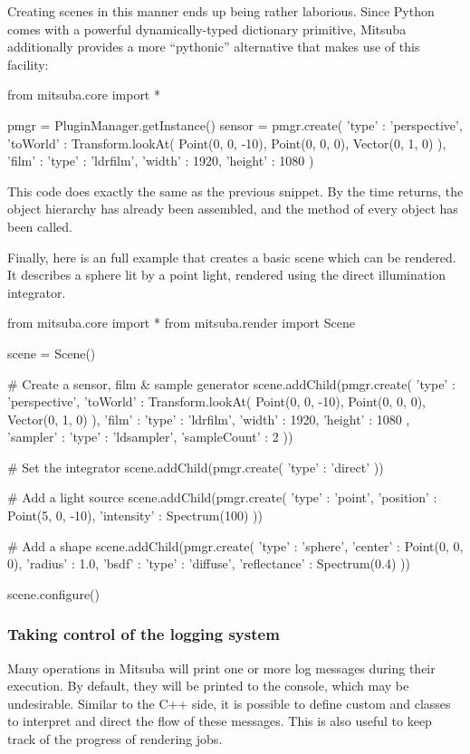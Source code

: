 Creating scenes in this manner ends up being rather laborious.
Since Python comes with a powerful dynamically-typed dictionary
primitive, Mitsuba additionally provides a more ``pythonic''
alternative that makes use of this facility:
\begin{python}
from mitsuba.core import *

pmgr = PluginManager.getInstance()
sensor = pmgr.create({
    'type' : 'perspective',
    'toWorld' : Transform.lookAt(
        Point(0, 0, -10),
        Point(0, 0, 0),
        Vector(0, 1, 0)
    ),
    'film' : {
        'type' : 'ldrfilm',
        'width' : 1920,
        'height' : 1080
    }
})
\end{python}
This code does exactly the same as the previous snippet.
By the time  returns, the object
hierarchy has already been assembled, and the
 method of every object
has been called.

Finally, here is an full example that creates a basic scene
which can be rendered. It describes a sphere lit by a point
light, rendered using the direct illumination integrator.
\begin{python}
from mitsuba.core import *
from mitsuba.render import Scene

scene = Scene()

# Create a sensor, film & sample generator
scene.addChild(pmgr.create({
    'type' : 'perspective',
    'toWorld' : Transform.lookAt(
        Point(0, 0, -10),
        Point(0, 0, 0),
        Vector(0, 1, 0)
    ),
    'film' : {
        'type' : 'ldrfilm',
        'width' : 1920,
        'height' : 1080
    },
    'sampler' : {
        'type' : 'ldsampler',
        'sampleCount' : 2
    }
}))

# Set the integrator
scene.addChild(pmgr.create({
    'type' : 'direct'
}))

# Add a light source
scene.addChild(pmgr.create({
    'type' : 'point',
    'position' : Point(5, 0, -10),
    'intensity' : Spectrum(100)
}))

# Add a shape
scene.addChild(pmgr.create({
    'type' : 'sphere',
    'center' : Point(0, 0, 0),
    'radius' : 1.0,
    'bsdf' : {
        'type' : 'diffuse',
        'reflectance' : Spectrum(0.4)
    }
}))

scene.configure()
\end{python}

\subsubsection{Taking control of the logging system}
Many operations in Mitsuba will print one or more log messages
during their execution. By default, they will be printed to the console,
which may be undesirable. Similar to the C++ side, it is possible to define
custom  and  classes to interpret and direct
the flow of these messages. This is also useful to keep track of the progress
of rendering jobs.

